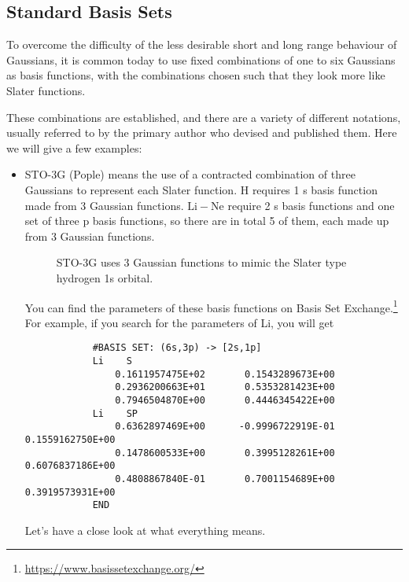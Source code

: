 \documentclass{article}
\theoremstyle{plain}\theoremheaderfont{\normalfont\itshape}\theorembodyfont{\rmfamily}\theoremseparator{.}\newtheorem*{rem}{Remark}\newtheorem*{ex}{Example}\newtheorem*{proof}{Proof}\newtheorem*{altp}{Alternative proof}
\theoremstyle{plain}\theoremheaderfont{\normalfont\bfseries}\theorembodyfont{\rmfamily}\theoremseparator{.}\newtheorem{thm}{Theorem}[section]\newtheorem{lem}[thm]{Lemma}\newtheorem{prop}[thm]{Proposition}\newtheorem*{cor}{Corollary}\newtheorem{defn}[thm]{Definition}\newtheorem{clm}[thm]{Claim}\newtheorem{clminproof}{Claim}
\theoremstyle{break}\theoremheaderfont{\normalfont\itshape}\theorembodyfont{\rmfamily}\theoremseparator{.\medskip}\newtheorem*{proofskip}{Proof}\newtheorem*{exs}{Examples}\newtheorem*{rems}{Remarks}
\theoremstyle{break}\theoremheaderfont{\normalfont\bfseries}\theorembodyfont{\rmfamily}\theoremseparator{.\medskip}\newtheorem{lemskip}[thm]{Lemma}\newtheorem{defnskip}[thm]{Definition}\newtheorem{propskip}[thm]{Proposition}\newtheorem{thmskip}[thm]{Theorem}
\numberwithin{equation}{section}
\newcommand{\x}{_{\text{x}}}
\begin{document}
    \subsection{Standard Basis Sets}
    To overcome the difficulty of the less desirable short and long range behaviour of Gaussians, it is common today to use fixed combinations of one to six Gaussians as basis functions, with the combinations chosen such that they look more like Slater functions.
    
    These combinations are established, and there are a variety of different notations, usually referred to by the primary author who devised and published them. Here we will give a few examples:
    \begin{itemize}[topsep=0pt,parsep=1em]
        \item STO-3G (Pople) means the use of a contracted combination of three Gaussians to represent each Slater function. \(\mathrm{H}\) requires 1 s basis function made from 3 Gaussian functions. \(\mathrm{Li-Ne}\) require 2 s basis functions and one set of three p basis functions, so there are in total 5 of them, each made up from 3 Gaussian functions.
        
        \begin{figure}[ht!]
            \centering
            \caption{STO-3G uses 3 Gaussian functions to mimic the Slater type hydrogen 1s orbital.}
        \end{figure}
        
        You can find the parameters of these basis functions on Basis Set Exchange.\footnote{\href{https://www.basissetexchange.org/}{\color{blue}https://www.basissetexchange.org/}} For example, if you search for the parameters of Li, you will get
        \begin{verbatim}
            #BASIS SET: (6s,3p) -> [2s,1p]
            Li    S
                0.1611957475E+02       0.1543289673E+00
                0.2936200663E+01       0.5353281423E+00
                0.7946504870E+00       0.4446345422E+00
            Li    SP
                0.6362897469E+00      -0.9996722919E-01       0.1559162750E+00
                0.1478600533E+00       0.3995128261E+00       0.6076837186E+00
                0.4808867840E-01       0.7001154689E+00       0.3919573931E+00
            END
        \end{verbatim}
        Let's have a close look at what everything means.


\end{itemize}
\end{document}
